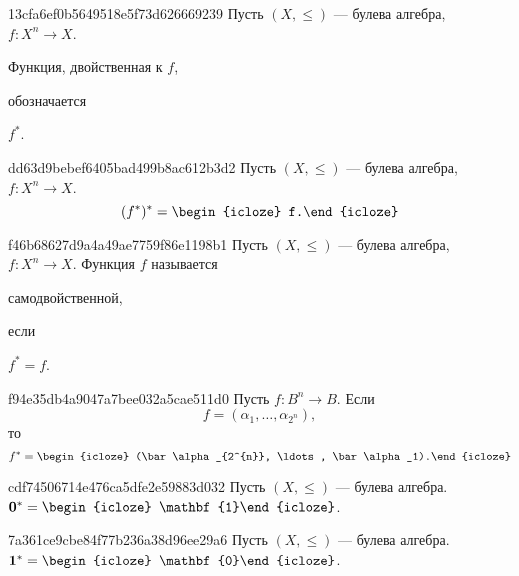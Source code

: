 \begin{note}{13cfa6ef0b5649518e5f73d626669239}
    Пусть \({ (X, \leqslant) }\) --- булева алгебра, \({ f : X^{n} \to X }\).
    \begin{icloze}{2}Функция, двойственная к \({ f }\),\end{icloze} обозначается \begin{icloze}{1}\({ f^* }\).\end{icloze}
\end{note}

\begin{note}{dd63d9bebef6405bad499b8ac612b3d2}
    Пусть \({ (X, \leqslant) }\) --- булева алгебра, \({ f : X^{n} \to X }\).
    \[
        (f^*)^* = \begin{icloze}{1}f.\end{icloze}
    \]
\end{note}

\begin{note}{f46b68627d9a4a49ae7759f86e1198b1}
    Пусть \({ (X, \leqslant) }\) --- булева алгебра, \({ f : X^{n} \to X }\).
    Функция \({ f }\) называется \begin{icloze}{1}самодвойственной,\end{icloze} если \begin{icloze}{2}\({ f^* = f }\).\end{icloze}
\end{note}

\begin{note}{f94e35db4a9047a7bee032a5cae511d0}
    Пусть \({ f : B^{n} \to B }\).
    Если
    \[
        f = (\alpha_1, \ldots, \alpha_{2^{n}}),
    \]
    то
    \[
        f^* = \begin{icloze}{1}(\bar \alpha_{2^{n}}, \ldots, \bar \alpha_1).\end{icloze}
    \]
\end{note}

\begin{note}{cdf74506714e476ca5dfe2e59883d032}
    Пусть \({ (X, \leqslant) }\) --- булева алгебра. \({ \mathbf{0}^* = \begin{icloze}{1}\mathbf{1}\end{icloze} }\).
\end{note}

\begin{note}{7a361ce9cbe84f77b236a38d96ee29a6}
    Пусть \({ (X, \leqslant) }\) --- булева алгебра. \({ \mathbf{1}^* = \begin{icloze}{1}\mathbf{0}\end{icloze} }\).
\end{note}

